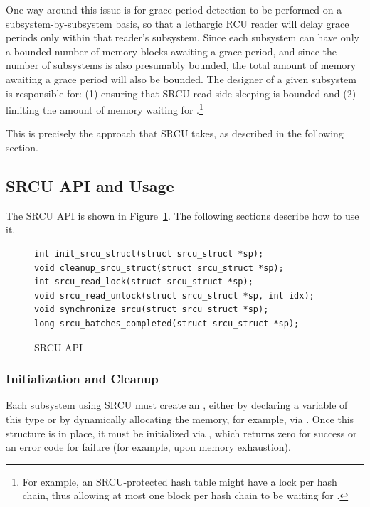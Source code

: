 One way around this issue is for grace-period detection to be performed
on a subsystem-by-subsystem basis, so that a lethargic RCU reader will
delay grace periods only within that reader's subsystem.
Since each subsystem can have only a bounded number of memory blocks
awaiting a grace period, and since the number of subsystems is also
presumably bounded, the total amount of memory awaiting a grace period
will also be bounded.
The designer of a given subsystem is responsible for: (1) ensuring that
SRCU read-side sleeping is bounded and (2) limiting the amount of memory
waiting for .\footnote{
	For example, an SRCU-protected hash table might have a lock
	per hash chain, thus allowing at most one block per hash
	chain to be waiting for .}

This is precisely the approach that SRCU takes, as described in the
following section.

\subsection{SRCU API and Usage}
\label{sec:app:rcuimpl:SRCU API and Usage}

The SRCU API is shown in Figure~\ref{fig:app:rcuimpl:SRCU API}.
The following sections describe how to use it.

\begin{figure}[htbp]
{ \scriptsize
\begin{verbatim}
int init_srcu_struct(struct srcu_struct *sp);
void cleanup_srcu_struct(struct srcu_struct *sp);
int srcu_read_lock(struct srcu_struct *sp);
void srcu_read_unlock(struct srcu_struct *sp, int idx);
void synchronize_srcu(struct srcu_struct *sp);
long srcu_batches_completed(struct srcu_struct *sp);
\end{verbatim}
}
\caption{SRCU API}
\label{fig:app:rcuimpl:SRCU API}
\end{figure}

\subsubsection{Initialization and Cleanup}
\label{sec:app:rcuimpl:Initialization and Cleanup}

Each subsystem using SRCU must create an
 ,
either by declaring a variable of this type or by
dynamically allocating the memory, for example, via .
Once this structure is in place, it must be initialized via
, which returns zero for success or an error
code for failure (for example, upon memory exhaustion).

